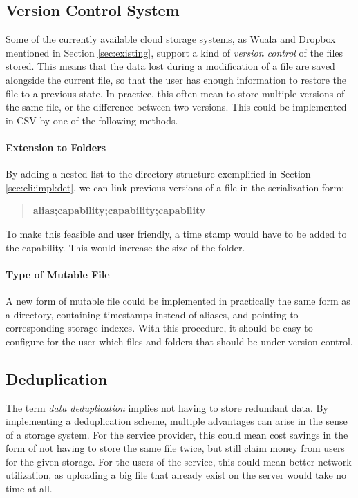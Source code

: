 \documentclass[pdftex,english,10pt,b5paper,twoside]{book}
\begin{document}
\subsection{Version Control System}

Some of the currently available cloud storage systems, as Wuala and Dropbox
mentioned in Section \ref{sec:existing}, support a kind of \emph{version
control} of the files stored. This means that the data lost during a
modification of a file are saved alongside the current file, so that the user
has enough information to restore the file to a previous state.  In practice,
this often mean to store multiple versions of the same file, or the difference
between two versions. This could be implemented in \ac{CSV} by one of the
following methods.

\paragraph{Extension to Folders} By adding a nested list to the directory
structure exemplified in Section \ref{sec:cli:impl:det}, we can link previous
versions of a file in the serialization form:

\begin{quote}
    \centering
    \textbf{alias;capability;capability;capability}
\end{quote}

To make this feasible and user friendly, a time stamp would have to be added to
the capability. This would increase the size of the folder.

\paragraph{Type of Mutable File} A new form of mutable file could be
implemented in practically the same form as a directory, containing timestamps
instead of aliases, and pointing to corresponding storage indexes. With this
procedure, it should be easy to configure for the user which files and folders
that should be under version control.

\subsection{Deduplication}

The term \emph{data deduplication} implies not having to store redundant data.
By implementing a deduplication scheme, multiple advantages can arise in the
sense of a storage system. For the service provider, this could mean cost
savings in the form of not having to store the same file twice, but still claim
money from users for the given storage. For the users of the service, this
could mean better network utilization, as uploading a big file that already
exist on the server would take no time at all.
\end{document}
